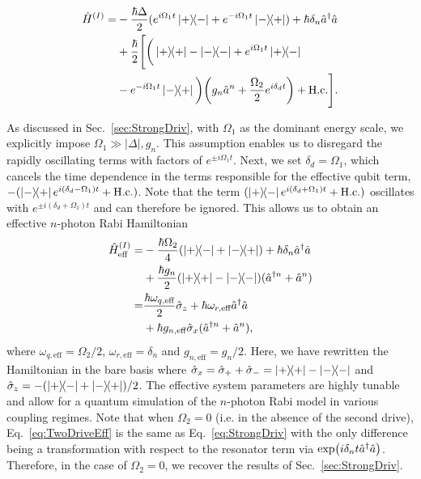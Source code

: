 \begin{align}\label{eq:TwoDriveIntPic}
    \hat{H}^{(I)}=&-\frac{\hbar\Delta}{2}(e^{i\Omega_1 t}\dyad{+}{-}+e^{-i\Omega_1 t}\dyad{-}{+}) +\hbar \delta_{n} \hat{a}^\dagger \hat{a} \nonumber\\ &+\frac{\hbar}{2}\Bigg[ \bigg(\dyad{+}-\dyad{-} +e^{i\Omega_1 t}\dyad{+}{-}\nonumber\\ &-e^{-i\Omega_1 t}\dyad{-}{+}\bigg)\bigg(g_n \hat{a}^n + \frac{\Omega_2}{2}e^{i\delta_d t}\bigg)+\text{H.c.}\Bigg].
\end{align}

As discussed in Sec.~\ref{sec:StrongDriv}, with $\Omega_1$ as the dominant energy scale, we explicitly impose $\Omega_1 \gg |\Delta|, g_n$. This assumption enables us to disregard the rapidly oscillating terms with factors of $e^{\pm i\Omega_1 t}$. Next, we set $\delta_d=\Omega_1$, which cancels the time dependence in the terms responsible for the effective qubit term, $-(\dyad{-}{+} e^{i(\delta_d -\Omega_1) t} + \text{H.c.})$. Note that the term $(\dyad{+}{-} e^{i(\delta_d +\Omega_1)t} + \text{H.c.})$ oscillates with $e^{\pm i (\delta_d + \Omega_1)t}$ and can therefore be ignored. This allows us to obtain an effective $n$-photon Rabi Hamiltonian
\begin{align}\label{eq:TwoDriveEff}
    \hat{H}_{\text{eff}}^{(I)}=&-\frac{\hbar \Omega_2}{4}(\dyad{+}{-}+\dyad{-}{+}) +\hbar \delta_n\hat{a}^\dagger \hat{a} \nonumber\\ &+ \frac{\hbar g_n}{2} (\dyad{+}-\dyad{-})(\hat{a}^{\dagger n} + \hat{a}^n)\nonumber\\ =& \frac{\hbar \omega_{q,\text{eff}}}{2}\hat{\sigma}_z + \hbar \omega_{r,\text{eff}}\hat{a}^\dagger \hat{a} \nonumber\\&+ \hbar g_{n,\text{eff}} \sigX (\hat{a}^{\dagger n} + \hat{a}^n),%
\end{align}
where $\omega_{q,\text{eff}}=\Omega_2/2$, $\omega_{r,\text{eff}}=\delta_{n}$ and $g_{n,\text{eff}}=g_n/2$. Here, we have rewritten the Hamiltonian in the bare basis where $\sigX=\sigP+\sigM=\dyad{+}-\dyad{-}$ and $\sigZ=-(\dyad{+}{-}+\dyad{-}{+})/2$.  The effective system parameters are highly tunable and allow for a quantum simulation of the $n$-photon Rabi model in various coupling regimes. Note that when $\Omega_2=0$ (i.e. in the absence of the second drive), Eq.~\eqref{eq:TwoDriveEff} is the same as Eq.~\eqref{eq:StrongDriv} with the only difference being a transformation with respect to the resonator term via $\exp(i\delta_n t \hat{a}^\dagger \hat{a})$. Therefore, in the case of $\Omega_2=0$, we recover the results of Sec.~\ref{sec:StrongDriv}.


